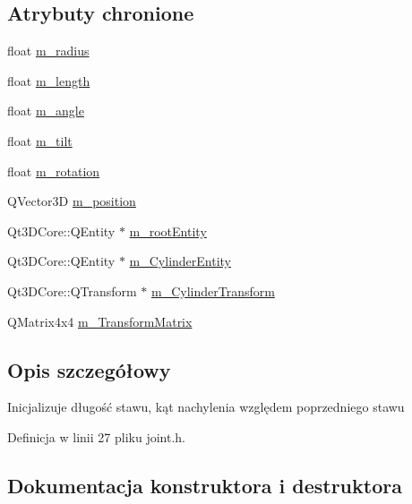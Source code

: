 \subsection*{Atrybuty chronione}
\begin{DoxyCompactItemize}
\item 
float \hyperlink{class_joint_a0badff470b9c02646557b848b12157bb}{m\+\_\+radius}
\item 
float \hyperlink{class_joint_a0aaf98e796494a327371cc5530172432}{m\+\_\+length}
\item 
float \hyperlink{class_joint_a293274b0f6de50fb79f532f64af9a048}{m\+\_\+angle}
\item 
float \hyperlink{class_joint_abe644639021eba36f36ec04a90d13af4}{m\+\_\+tilt}
\item 
float \hyperlink{class_joint_a60e475f7439a1bae1ce859de007d3e84}{m\+\_\+rotation}
\item 
Q\+Vector3D \hyperlink{class_joint_a2fd3f63f13b42041f7b40511e7075061}{m\+\_\+position}
\item 
Qt3\+D\+Core\+::\+Q\+Entity $\ast$ \hyperlink{class_joint_aee7172c3678a1cb2fb916f5cd3768a9b}{m\+\_\+root\+Entity}
\item 
Qt3\+D\+Core\+::\+Q\+Entity $\ast$ \hyperlink{class_joint_a0862c4b658d00415ae4952e43af4931b}{m\+\_\+\+Cylinder\+Entity}
\item 
Qt3\+D\+Core\+::\+Q\+Transform $\ast$ \hyperlink{class_joint_af86be64ec4dfe808d941a322867ee984}{m\+\_\+\+Cylinder\+Transform}
\item 
Q\+Matrix4x4 \hyperlink{class_joint_adc692e48ac1dc140134627aa445dc160}{m\+\_\+\+Transform\+Matrix}
\end{DoxyCompactItemize}


\subsection{Opis szczegółowy}
Inicjalizuje długość stawu, kąt nachylenia względem poprzedniego stawu 

Definicja w linii 27 pliku joint.\+h.



\subsection{Dokumentacja konstruktora i destruktora}
\mbox{\label{class_joint_a0a60e63cceeb93ef8a308ebf2eaa8d68}} 
